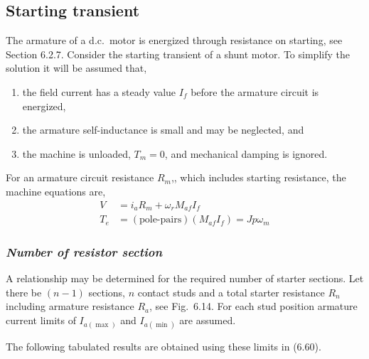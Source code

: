 \documentclass[a4paper,numbers=noenddot,12pt]{scrbook}
\begin{document}
    \subsection{Starting transient}
    The armature of a d.c.\ motor is energized through resistance on starting, see Section 6.2.7. Consider the starting transient of a shunt motor. To simplify the solution it will be assumed that,
    \begin{enumerate}
        \item the field current has a steady value $I_f$ before the armature circuit is energized,
        \item the armature self-inductance is small and may be neglected, and
        \item the machine is unloaded, $T_m = 0$, and mechanical damping is ignored.
    \end{enumerate}

    For an armature circuit resistance $R_m$,, which includes starting resistance, the machine equations are,
    \begin{align}
        V & = i_a R_m + \omega_r M_{af} I_f \\
        T_e & = {(\text{pole-pairs})}(M_{af} I_f) = J p \omega_m
        \label{}
    \end{align}
    \subsubsection{\textit{Number of resistor section}}
    A relationship may be determined for the required number of starter sections. Let there be $(n - 1)$ sections, $n$ contact studs and a total starter resistance $R_n$ including armature resistance $R_a$, see Fig.\ 6.14. For each stud position armature current limits of $I_{a(\max)}$ and $I_{a(\min)}$ are assumed.

    The following tabulated results are obtained using these limits in (6.60).
\end{document}
